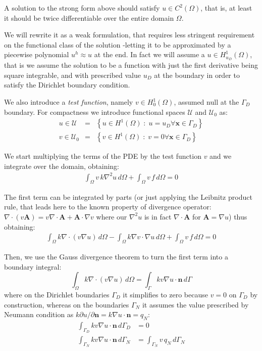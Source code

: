 \documentclass{digitaldynamics}
\def\vect#1{\bm{#1}}
\begin{document}
A solution to the strong form above should satisfy $u \in C^2(\Omega)$, that is, at least it should be twice differentiable over the entire domain $\Omega$. 

We will rewrite it as a weak formulation, that requires less stringent requirement on the functional class of the solution -letting it to be approximated by a piecewise polynomial $u^h \approx u$ at the end. In fact we will assume a $u \in H^1_{u_D}(\Omega)$, that is we assume the solution to be a function with just the first derivative being square integrable, and with prescribed value $u_D$ at the boundary in order to satisfy the Dirichlet boundary condition.

We also introduce a \textit{test function}, namely $v \in H^1_0(\Omega)$, assumed null at the $\Gamma_D$ boundary. 
For compactness we introduce functional spaces $\mathcal{U}$ and $\mathcal{U}_0$ as:
\begin{align}
	u \in \mathcal{U}   &=& \left\{  u \in H^1(\Omega) \; : \; u=u_D \forall \vect{x} \in \Gamma_D \right\} \\
	v \in \mathcal{U}_0 &=& \left\{  v \in H^1(\Omega) \; : \; v=0   \forall \vect{x} \in \Gamma_D \right\}
\end{align}



We start multiplying the terms of the PDE by the test function $v$ and we integrate over the domain, obtaining:
\begin{align}
	\int_\Omega v \, k\nabla^2 u  \, d\Omega + \int_\Omega  v \, f \, d\Omega = 0
	\label{eq:weakpoisson01}
\end{align}

The first term can be integrated by parts (or just applying the Leibnitz product rule, that leads here to the known property of divergence operator: $\nabla\cdot\left(v\mathbf{A}\right)= v\nabla\cdot\mathbf{A}+\mathbf{A}\cdot\nabla v$ where our $\nabla^2 u$ is in fact $\nabla\cdot\mathbf{A}$ for $\mathbf{A}=\nabla u$) thus obtaining:
\begin{align}
	\int_\Omega k \nabla \cdot (v \nabla u)  \,d\Omega - \int_\Omega k \nabla v \cdot \nabla u \,d\Omega    + \int_\Omega  v \, f  \,d\Omega = 0
	\label{eq:weakpoisson02}
\end{align}

Then, we use the Gauss divergence theorem to turn the first term into a boundary integral:
\[
\int_\Omega k \nabla \cdot (v \nabla u)  \,d\Omega = \int_{\Gamma} k v \nabla u \cdot \vect{n} \,d\Gamma
\]
where on the Dirichlet boundaries $\Gamma_D$ it simplifies to zero because $v=0$ on $\Gamma_D$ by construction, whereas on the 
boundaries $\Gamma_N$ it assumes the value prescribed by Neumann condition as $ k \partial{u}/\partial{\vect{n}} = k \nabla u \cdot \vect{n} = q_N$:
\begin{align}
\int_{\Gamma_D} k v \nabla u \cdot \vect{n} \,d\Gamma_D &= 0 \\
\int_{\Gamma_N} k v \nabla u \cdot \vect{n} \,d\Gamma_N &= \int_{\Gamma_N} v \, q_N \,d\Gamma_N
\end{align}
\end{document}
